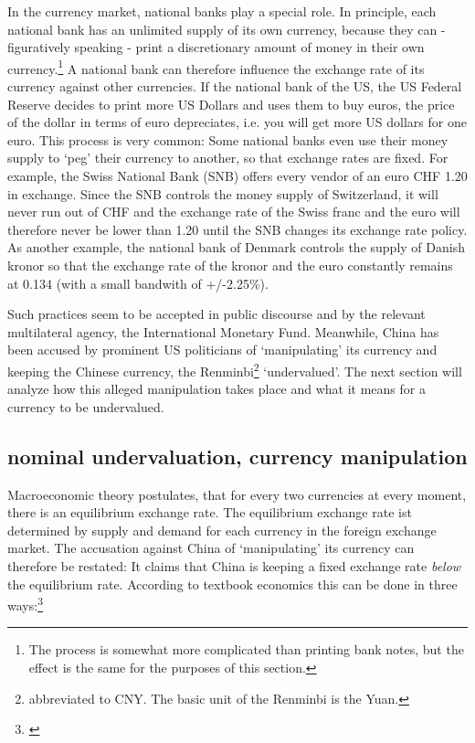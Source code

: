 \documentclass[11pt]{article}
\begin{document}
In the currency market, national banks play a special role. In principle, each national bank has an unlimited supply of its own currency, because they can - figuratively speaking - print a discretionary amount of money in their own currency.\footnote{The process is somewhat more complicated than printing bank notes, but the effect is the same for the purposes of this section.} A national bank can therefore influence the exchange rate of its currency against other currencies. If the national bank of the US, the US Federal Reserve decides to print more US Dollars and uses them to buy euros, the price of the dollar in terms of euro depreciates, i.e. you will get more US dollars for one euro. This process is very common: Some national banks even use their money supply to `peg' their currency to another, so that exchange rates are fixed. For example, the Swiss National Bank (SNB) offers every vendor of an euro CHF 1.20 in exchange. Since the SNB controls the money supply of Switzerland, it will never run out of CHF and the exchange rate of the Swiss franc and the euro will therefore never be lower than 1.20 until the SNB changes its exchange rate policy. As another example, the national bank of Denmark controls the supply of Danish kronor so that the exchange rate of the kronor and the euro constantly remains at 0.134 (with a small bandwith of +/-2.25\%). 

Such practices seem to be accepted in public discourse and by the relevant multilateral agency, the International Monetary Fund. Meanwhile, China has been accused by prominent US politicians of `manipulating' its currency and keeping the Chinese currency, the Renminbi\footnote{abbreviated to CNY. The basic unit of the Renminbi is the Yuan.} `undervalued'. The next section will analyze how this alleged manipulation takes place and what it means for a currency to be undervalued. 

\subsection{nominal undervaluation, currency manipulation}

Macroeconomic theory postulates, that for every two currencies at every moment, there is an equilibrium exchange rate. The equilibrium exchange rate ist determined by supply and demand for each currency in the foreign exchange market. The accusation against China of `manipulating' its currency can therefore be restated: It claims that China is keeping a fixed exchange rate \emph{below} the equilibrium rate. According to textbook economics this can be done in three ways:\footnote{\cite[pp. 514]{Krugman2008}}
\end{document}
